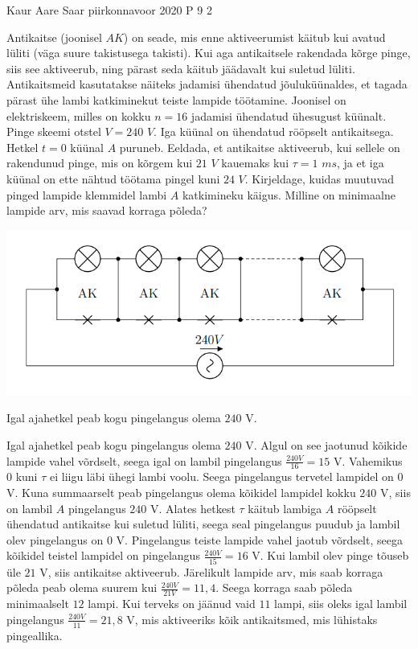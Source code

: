 {Kaur Aare Saar} %
{piirkonnavoor} %
{2020} %
{P 9} %
{2} %
{

\ifStatement
Antikaitse (joonisel $AK$) on seade, mis enne aktiveerumist käitub kui avatud lüliti (väga suure takistusega takisti). Kui aga antikaitsele rakendada kõrge pinge, siis see aktiveerub, ning pärast seda käitub jäädavalt kui suletud lüliti. Antikaitsmeid kasutatakse näiteks jadamisi ühendatud jõuluküünaldes, et tagada pärast ühe lambi katkiminekut teiste lampide töötamine. Joonisel on elektriskeem, milles on kokku $n = 16$ jadamisi ühendatud ühesugust küünalt. Pinge skeemi otstel $V = 240$ $V$. Iga küünal on ühendatud rööpselt antikaitsega. Hetkel $t = 0$ küünal $A$ puruneb. Eeldada, et antikaitse aktiveerub, kui sellele on rakendunud pinge, mis on kõrgem kui $21$ $V$ kauemaks kui $\tau = 1$ $ms$, ja et iga küünal on ette nähtud töötama pingel kuni $24$ $V$. Kirjeldage, kuidas muutuvad pinged lampide klemmidel lambi $A$ katkimineku käigus.  Milline on minimaalne lampide arv, mis saavad korraga põleda?
\begin{center}
	\includegraphics[width=0.5\linewidth]{2020-v2p-09-yl.png}
\end{center}
\fi

\ifHint
Igal ajahetkel peab kogu pingelangus olema $240$ V.
\fi


\ifSolution
Igal ajahetkel peab kogu pingelangus olema $240$ V. Algul on see jaotunud kõikide lampide vahel võrdselt, seega igal on lambil pingelangus $\frac{240 V}{16} = 15$ V. Vahemikus $0$ kuni $\tau$ ei liigu läbi ühegi lambi voolu. Seega pingelangus tervetel lampidel on $0$ V. Kuna summaarselt peab pingelangus olema kõikidel lampidel kokku $240$ V, siis on lambil $A$ pingelangus $240$ V. Alates hetkest $\tau$ käitub lambiga $A$ rööpselt ühendatud antikaitse kui suletud lüliti, seega seal pingelangus puudub ja lambil olev pingelangus on $0$ V. Pingelangus teiste lampide vahel jaotub võrdselt, seega kõikidel teistel lampidel on pingelangus $\frac{240 V}{15} = 16$ V. Kui lambil olev pinge tõuseb üle $21$ V, siis antikaitse aktiveerub. Järelikult lampide arv, mis saab korraga põleda peab olema suurem kui $\frac{240 V}{21 V} = 11,4$. Seega korraga saab põleda minimaalselt $12$ lampi. Kui terveks on jäänud vaid $11$ lampi, siis oleks igal lambil pingelangus $\frac{240 V}{11}= 21,8$ V, mis aktiveeriks kõik antikaitsmed, mis lühistaks pingeallika.
\fi
}